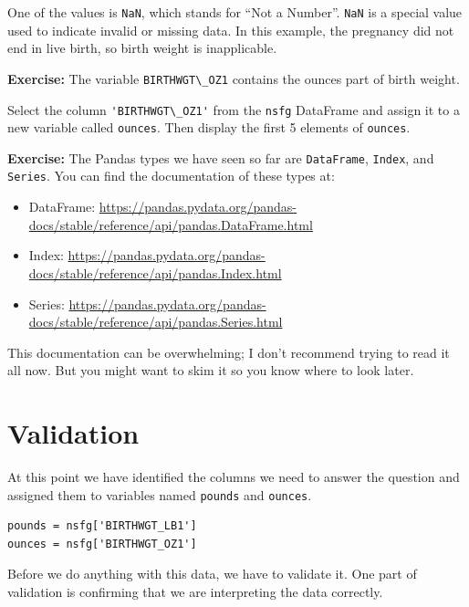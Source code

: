 One of the values is \passthrough{\lstinline!NaN!}, which stands for
``Not a Number''. \passthrough{\lstinline!NaN!} is a special value used
to indicate invalid or missing data. In this example, the pregnancy did
not end in live birth, so birth weight is inapplicable.

\textbf{Exercise:} The variable \passthrough{\lstinline!BIRTHWGT\_OZ1!}
contains the ounces part of birth weight.

Select the column \passthrough{\lstinline!'BIRTHWGT\_OZ1'!} from the
\passthrough{\lstinline!nsfg!} DataFrame and assign it to a new variable
called \passthrough{\lstinline!ounces!}. Then display the first 5
elements of \passthrough{\lstinline!ounces!}.

\textbf{Exercise:} The Pandas types we have seen so far are
\passthrough{\lstinline!DataFrame!}, \passthrough{\lstinline!Index!},
and \passthrough{\lstinline!Series!}. You can find the documentation of
these types at:

\begin{itemize}
\item
  DataFrame:
  \url{https://pandas.pydata.org/pandas-docs/stable/reference/api/pandas.DataFrame.html}
\item
  Index:
  \url{https://pandas.pydata.org/pandas-docs/stable/reference/api/pandas.Index.html}
\item
  Series:
  \url{https://pandas.pydata.org/pandas-docs/stable/reference/api/pandas.Series.html}
\end{itemize}

This documentation can be overwhelming; I don't recommend trying to read
it all now. But you might want to skim it so you know where to look
later.

\hypertarget{validation}{%
\section{Validation}\label{validation}}

At this point we have identified the columns we need to answer the
question and assigned them to variables named
\passthrough{\lstinline!pounds!} and \passthrough{\lstinline!ounces!}.

\begin{lstlisting}[]
pounds = nsfg['BIRTHWGT_LB1']
ounces = nsfg['BIRTHWGT_OZ1']
\end{lstlisting}

Before we do anything with this data, we have to validate it. One part
of validation is confirming that we are interpreting the data correctly.

